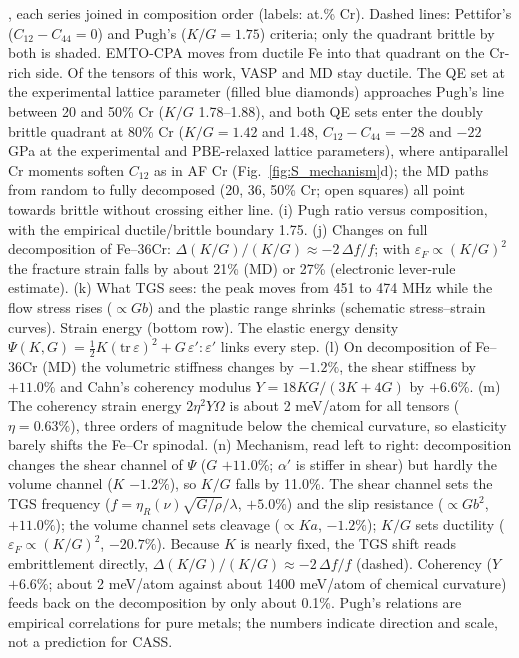 \documentclass[final,3p,times]{elsarticle}
\providecommand{\DIFaddend}{} %
\DeclareRobustCommand{\DIFaddend}{\DIFOaddend \let\includegraphics\DIFOincludegraphics} %
\begin{document}
{, each series joined in composition order (labels: at.\% Cr). Dashed lines: Pettifor's ($C_{12}-C_{44}=0$) and Pugh's ($K/G=1.75$) criteria; only the quadrant brittle by both is shaded. EMTO-CPA moves from ductile Fe into that quadrant on the Cr-rich side. Of the tensors of this work, VASP and MD stay ductile. The QE set at the experimental lattice parameter (filled blue diamonds) approaches Pugh's line between 20 and 50\% Cr ($K/G$ 1.78--1.88), and both QE sets enter the doubly brittle quadrant at 80\% Cr ($K/G=1.42$ and 1.48, $C_{12}-C_{44}=-28$ and $-22$ GPa at the experimental and PBE-relaxed lattice parameters), where antiparallel Cr moments soften $C_{12}$ as in AF Cr (Fig.~\ref{fig:S_mechanism}d); the MD paths from random to fully decomposed (20, 36, 50\% Cr; open squares) all point towards brittle without crossing either line. (i) Pugh ratio versus composition, with the empirical ductile/brittle boundary 1.75. (j) Changes on full decomposition of Fe--36Cr: $\Delta(K/G)/(K/G)\approx-2\,\Delta f/f$; with $\varepsilon_F\propto(K/G)^2$ the fracture strain falls by about 21\% (MD) or 27\% (electronic lever-rule estimate). (k) What TGS sees: the peak moves from 451 to 474 MHz while the flow stress rises ($\propto Gb$) and the plastic range shrinks (schematic stress--strain curves). Strain energy (bottom row). The elastic energy density $\Psi(K,G)=\frac{1}{2}K(\mathrm{tr}\,\varepsilon)^2+G\,\varepsilon':\varepsilon'$ links every step. (l) On decomposition of Fe--36Cr (MD) the volumetric stiffness changes by $-1.2\%$, the shear stiffness by $+11.0\%$ and Cahn's coherency modulus $Y=18KG/(3K+4G)$ by $+6.6\%$. (m) The coherency strain energy $2\eta^2Y\Omega$ is about 2 meV/atom for all tensors ($\eta=0.63\%$), three orders of magnitude below the chemical curvature, so elasticity barely shifts the Fe--Cr spinodal. (n) Mechanism, read left to right: decomposition changes the shear channel of $\Psi$ ($G$ $+11.0\%$; $\alpha'$ is stiffer in shear) but hardly the volume channel ($K$ $-1.2\%$), so $K/G$ falls by 11.0\%. The shear channel sets the TGS frequency ($f=\eta_R(\nu)\sqrt{G/\rho}/\lambda$, $+5.0\%$) and the slip resistance ($\propto Gb^2$, $+11.0\%$); the volume channel sets cleavage ($\propto Ka$, $-1.2\%$); $K/G$ sets ductility ($\varepsilon_F\propto(K/G)^2$, $-20.7\%$). Because $K$ is nearly fixed, the TGS shift reads embrittlement directly, $\Delta(K/G)/(K/G)\approx-2\,\Delta f/f$ (dashed). Coherency ($Y$ $+6.6\%$; about 2 meV/atom against about 1400 meV/atom of chemical curvature) feeds back on the decomposition by only about 0.1\%. Pugh's relations are empirical correlations for pure metals; the numbers indicate direction and scale, not a prediction for CASS.
}\clearpage
\DIFaddend 
\end{document}
